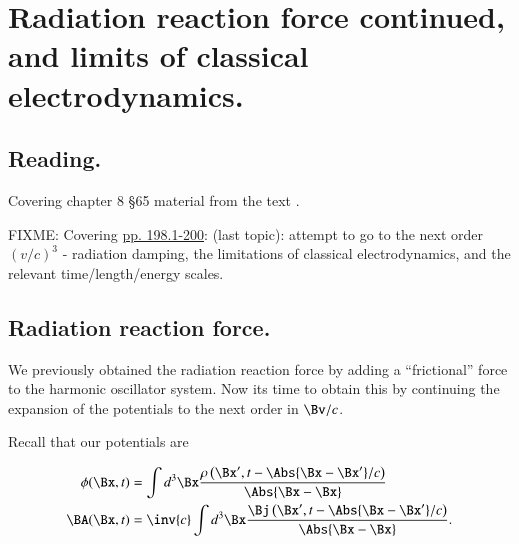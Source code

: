 %
%

\chapter{Radiation reaction force continued, and limits of classical electrodynamics.}
\label{chap:relativisticElectrodynamicsL27}
{}
\date{April 6, 2011}

\beginArtNoToc

\section{Reading.}

Covering chapter 8 \S 65 material from the text \cite{landau1980classical}.

FIXME: Covering \href{http://www.physics.utoronto.ca/~poppitz/epoppitz/PHY450_files/RelEMpp181-195.pdf}{pp. 198.1-200}: (last topic): attempt to go to the next order $(v/c)^3$ - radiation damping, the limitations of classical electrodynamics, and the relevant time/length/energy scales.

\section{Radiation reaction force.}

We previously obtained the radiation reaction force by adding a ``frictional'' force to the harmonic oscillator system.  Now its time to obtain this by continuing the expansion of the potentials to the next order in $\Bv/c$.

Recall that our potentials are

\begin{align}\label{eqn:relativisticElectrodynamicsL27:10}
\phi(\Bx, t) &= \int d^3 \Bx \frac{\rho\left(\Bx', t - \Abs{\Bx - \Bx'}/c\right)}{\Abs{\Bx - \Bx}} \\
\BA(\Bx, t) &= \inv{c}\int d^3 \Bx \frac{\Bj\left(\Bx', t - \Abs{\Bx - \Bx'}/c\right)}{\Abs{\Bx - \Bx}}.
\end{align}

